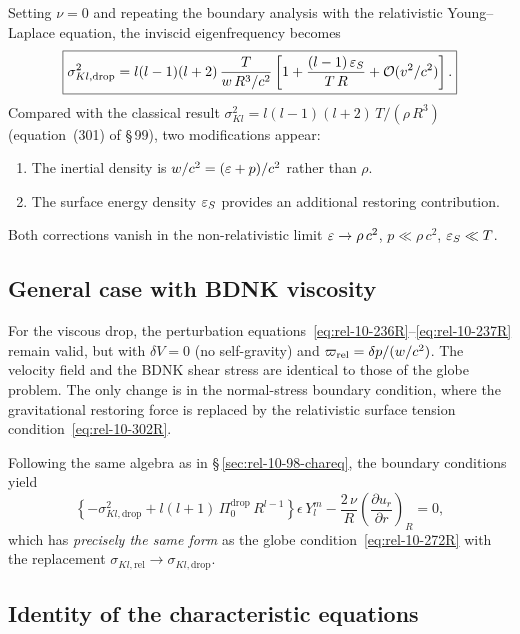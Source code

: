 Setting $\nu = 0$ and repeating the boundary analysis with the
relativistic Young--Laplace equation, the inviscid eigenfrequency
becomes
\begin{equation}\label{eq:rel-10-301R}
  \boxed{
  \sigma_{Kl,\mathrm{drop}}^{2}
  = l(l-1)(l+2)\,\frac{T}{w\,R^{3}/c^{2}}
    \left[1 + \frac{(l-1)\,\varepsilon_{S}}{T\,R}
          + \mathcal{O}(v^{2}/c^{2})\right].
  }
\end{equation}
Compared with the classical result
$\sigma_{Kl}^{2} = l(l-1)(l+2)\,T/(\rho\,R^{3})$
(equation~(301) of \S\,99), two modifications appear:
\begin{enumerate}
\item The inertial density is
  $w/c^{2} = (\varepsilon + p)/c^{2}$ rather than $\rho$.
\item The surface energy density $\varepsilon_{S}$ provides an additional
  restoring contribution.
\end{enumerate}
Both corrections vanish in the non-relativistic limit
$\varepsilon\to\rho\,c^{2}$, $p \ll \rho\,c^{2}$,
$\varepsilon_{S}\ll T$.

\subsection{General case with BDNK viscosity}
\label{sec:rel-10-99-general}

For the viscous drop, the perturbation
equations~\eqref{eq:rel-10-236R}--\eqref{eq:rel-10-237R} remain
valid, but with $\delta V = 0$ (no self-gravity) and
$\varpi_{\mathrm{rel}} = \delta p/(w/c^{2})$.
The velocity field and the BDNK shear stress are
identical to those of the globe problem.  The only change is in
the normal-stress boundary condition, where the gravitational
restoring force is replaced by the relativistic surface tension
condition~\eqref{eq:rel-10-302R}.

Following the same algebra as in
\S\,\ref{sec:rel-10-98-chareq}, the boundary conditions yield
\begin{equation}\label{eq:rel-10-304R}
  \left\{-\sigma_{Kl,\mathrm{drop}}^{2}
         + l(l+1)\,\Pi_{0}^{\mathrm{drop}}\,R^{l-1}
  \right\}\epsilon\,Y_{l}^{m}
  - \frac{2\,\nu}{R}
    \left(\frac{\partial u_{r}}{\partial r}\right)_{\!R}
  = 0,
\end{equation}
which has \emph{precisely the same form} as the globe
condition~\eqref{eq:rel-10-272R} with the replacement
$\sigma_{Kl,\mathrm{rel}}\to\sigma_{Kl,\mathrm{drop}}$.

\subsection{Identity of the characteristic equations}

